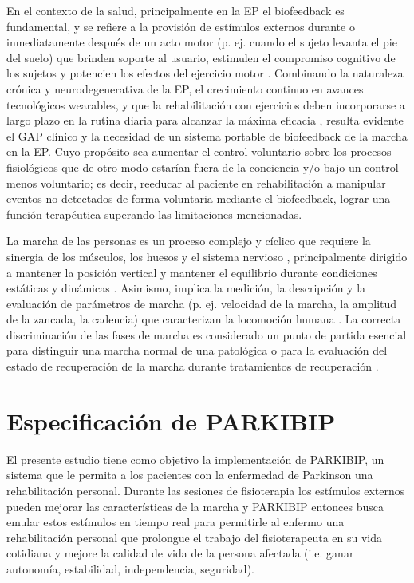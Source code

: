 En el contexto de la salud, principalmente en la EP el biofeedback es fundamental, y se refiere a la provisión de estímulos externos durante o inmediatamente después de un acto motor (p. ej. cuando el sujeto levanta el pie del suelo) que brinden soporte al usuario, estimulen el compromiso cognitivo de los sujetos y potencien los efectos del ejercicio motor \cite{Rochester2010,Nieuwboer2007,Rocha2014,Spaulding2013}. Combinando la naturaleza crónica y neurodegenerativa de la EP, el crecimiento continuo en avances tecnológicos wearables, y que la rehabilitación con ejercicios deben incorporarse a largo plazo en la rutina diaria para alcanzar la máxima eficacia \cite{Tomlinson2012,Lamotte2014}, resulta evidente el GAP clínico y la necesidad de un sistema portable de biofeedback de la marcha en la EP. Cuyo propósito sea aumentar el control voluntario sobre los procesos fisiológicos que de otro modo estarían fuera de la conciencia y/o bajo un control menos voluntario; es decir, reeducar al paciente en rehabilitación a manipular eventos no detectados de forma voluntaria mediante el biofeedback, lograr una función terapéutica superando las limitaciones mencionadas.

La marcha de las personas es un proceso complejo y cíclico que requiere la sinergia de los músculos, los huesos y el sistema nervioso \cite{SAUNDERS1953}, principalmente dirigido a mantener la posición vertical y mantener el equilibrio durante condiciones estáticas y dinámicas \cite{Ayyappa1997}. Asimismo, implica la medición, la descripción y la evaluación de parámetros de marcha (p. ej. velocidad de la marcha, la amplitud de la zancada, la cadencia) que caracterizan la locomoción humana \cite{Ribeiro2017}. La correcta discriminación de las fases de marcha es considerado un punto de partida esencial para distinguir una marcha normal de una patológica o para la evaluación del estado de recuperación de la marcha durante tratamientos de recuperación \cite{Taborri2016}.

\section{Especificación de PARKIBIP}

El presente estudio tiene como objetivo la implementación de PARKIBIP, un sistema que le permita a los pacientes con la enfermedad de Parkinson una rehabilitación personal. Durante las sesiones de fisioterapia los estímulos externos pueden mejorar las características de la marcha y PARKIBIP entonces busca emular estos estímulos en tiempo real para permitirle al enfermo una rehabilitación personal que prolongue el trabajo del fisioterapeuta en su vida cotidiana y mejore la calidad de vida de la persona afectada (i.e. ganar autonomía, estabilidad, independencia, seguridad).

